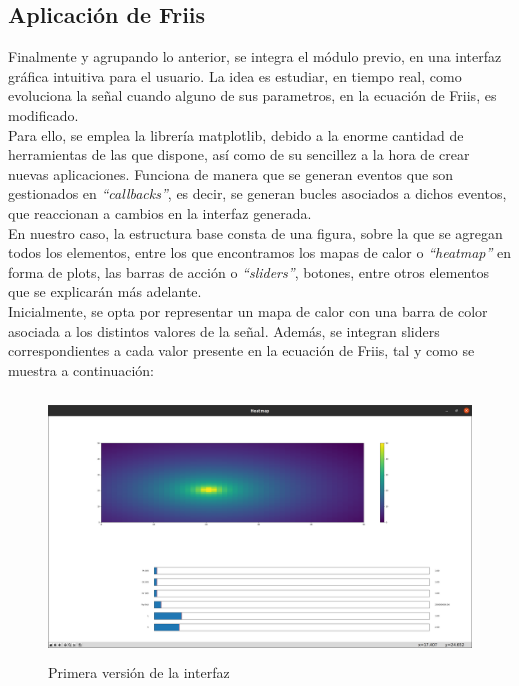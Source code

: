 \subsection{Aplicación de Friis}
\label{subsec:friis-app}

Finalmente y agrupando lo anterior, se integra el módulo previo, en una interfaz gráfica intuitiva para el usuario. La idea es estudiar, en tiempo real, como evoluciona la señal cuando alguno de sus parametros, en la ecuación de Friis, es modificado.\\

Para ello, se emplea la librería matplotlib, debido a la enorme cantidad de herramientas de las que dispone, así como de su sencillez a la hora de crear nuevas aplicaciones. Funciona de manera que se generan eventos que son gestionados en \emph{``callbacks''}, es decir, se generan bucles asociados a dichos eventos, que reaccionan a cambios en la interfaz generada.\\

En nuestro caso, la estructura base consta de una figura, sobre la que se agregan todos los elementos, entre los que encontramos los mapas de calor o \emph{``heatmap''} en forma de plots, las barras de acción o \emph{``sliders''}, botones, entre otros elementos que se explicarán más adelante.\\

Inicialmente, se opta por representar un mapa de calor con una barra de color asociada a los distintos valores de la señal. Además, se integran sliders correspondientes a cada valor presente en la ecuación de Friis, tal y como se muestra a continuación:\\

\begin{figure} [H]
	\begin{center}
	\includegraphics[height=7cm]{imagenes/cap4/6_Friss_firstGUI.png}
	\end{center}
	\caption[Primera versión de la interfaz]{Primera versión de la interfaz}
	\label{fig:friis_init_app}
\end{figure}


